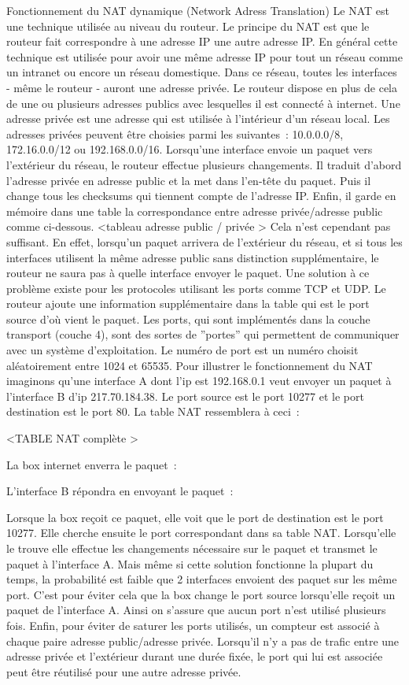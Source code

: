 \documentclass[twoside,openright,a4paper,11pt,french]{article}
\begin{document}
Fonctionnement du NAT dynamique (Network Adress Translation)
Le NAT est une technique utilisée au niveau du routeur. Le principe du NAT est que le routeur fait correspondre à une adresse IP une autre adresse IP. En général cette technique est utilisée pour avoir une même adresse IP pour tout un réseau comme un intranet ou encore un réseau domestique. Dans ce réseau, toutes les interfaces - même le routeur - auront une adresse privée. Le routeur dispose en plus de cela de une ou plusieurs adresses publics avec lesquelles il est connecté à internet. Une adresse privée est une adresse qui est utilisée à l'intérieur d'un réseau local. Les adresses privées peuvent être choisies parmi les suivantes : 10.0.0.0/8, 172.16.0.0/12 ou 192.168.0.0/16.
Lorsqu'une interface envoie un paquet vers l'extérieur du réseau, le routeur effectue plusieurs changements. Il traduit d'abord l'adresse privée en adresse public et la met dans l'en-tête du paquet. Puis il change tous les checksums qui tiennent compte de l'adresse IP. Enfin, il garde en mémoire dans une table la correspondance entre adresse privée/adresse public comme ci-dessous.
<tableau adresse public / privée >
Cela n'est cependant pas suffisant. En effet, lorsqu'un paquet arrivera de l'extérieur du réseau,  et si tous les interfaces utilisent la même adresse public sans distinction supplémentaire, le routeur ne saura pas à quelle interface envoyer le paquet. 
Une solution à ce problème existe pour les protocoles utilisant les ports comme TCP et UDP. Le routeur ajoute une information supplémentaire dans la table qui est le port source d'où vient le paquet. Les ports, qui sont implémentés dans la couche transport (couche 4), sont des sortes de ''portes'' qui permettent de communiquer avec un système d'exploitation. Le numéro de port est un numéro choisit aléatoirement entre 1024 et 65535.
Pour illustrer le fonctionnement du NAT imaginons qu'une interface A dont l'ip est 192.168.0.1 veut envoyer un paquet à l'interface B d'ip 217.70.184.38. Le port source est le port 10277 et le port destination est le port 80. 
La table NAT ressemblera à ceci : 

<TABLE NAT complète > 

La box internet enverra le paquet : 

L'interface B répondra en envoyant le paquet :

Lorsque la box reçoit ce paquet, elle voit que le port de destination est le port 10277. Elle cherche ensuite le port correspondant dans sa table NAT. Lorsqu'elle le trouve elle effectue les changements nécessaire sur le paquet et transmet le paquet à l'interface A.
Mais même si cette solution fonctionne la plupart du temps, la probabilité est faible que 2 interfaces envoient des paquet sur les même port. C'est pour éviter cela que la box change le port source lorsqu'elle reçoit un paquet de l'interface A. Ainsi on s'assure que aucun port n'est utilisé plusieurs fois. Enfin, pour éviter de saturer les ports utilisés, un compteur est associé à chaque paire adresse public/adresse privée. Lorsqu'il n'y a pas de trafic entre une adresse privée et l'extérieur durant une durée fixée, le port qui lui est associée peut être réutilisé pour une autre adresse privée.
\end{document}
